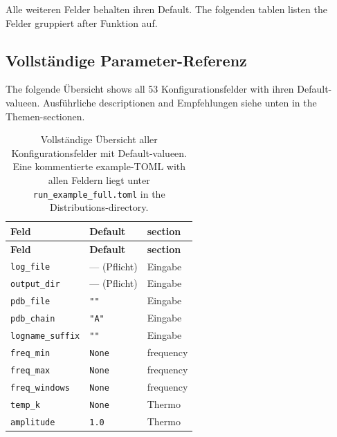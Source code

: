 \documentclass[11pt,a4paper,twoside]{article}
\theoremstyle{remark}
\begin{document}
Alle weiteren Felder behalten ihren Default. The folgenden tablen
listen the Felder gruppiert after Funktion auf.

\subsection{Vollst\"andige Parameter-Referenz}
\label{sec:param-referenz}

The folgende \"Ubersicht shows all 53 Konfigurationsfelder with ihren
Default-valueen. Ausf\"uhrliche descriptionen and Empfehlungen siehe
unten in the Themen-sectionen.

\begin{longtable}{p{} p{} p{}}
\caption{Vollst\"andige \"Ubersicht aller Konfigurationsfelder mit
Default-valueen. Eine kommentierte example-TOML with allen Feldern liegt
unter \texttt{run\_example\_full.toml} in the Distributions-directory.}
\label{tab:param-overview} \\
\toprule
\textbf{Feld} & \textbf{Default} & \textbf{section} \\
\midrule
\endfirsthead
\toprule
\textbf{Feld} & \textbf{Default} & \textbf{section} \\
\midrule
\endhead
\texttt{log\_file}                  & --- (Pflicht)        & Eingabe \\
\texttt{output\_dir}                & --- (Pflicht)        & Eingabe \\
\texttt{pdb\_file}                  & \texttt{""}          & Eingabe \\
\texttt{pdb\_chain}                 & \texttt{"A"}         & Eingabe \\
\texttt{logname\_suffix}            & \texttt{""}          & Eingabe \\
\midrule
\texttt{freq\_min}                  & \texttt{None}        & frequency \\
\texttt{freq\_max}                  & \texttt{None}        & frequency \\
\texttt{freq\_windows}              & \texttt{None}        & frequency \\
\midrule
\texttt{temp\_k}                    & \texttt{None}        & Thermo \\
\texttt{amplitude}                  & \texttt{1.0}         & Thermo \\

\end{longtable}
\end{document}

